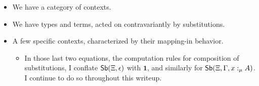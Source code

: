 \documentclass{article}
\begin{document}
\begin{itemize}
    \item We have a category of contexts.
    \item We have types and terms, acted on contravariantly by substitutions.
    \item A few specific contexts, characterized by their mapping-in behavior.
    \begin{itemize}
        \item In those last two equations, the computation rules for composition of substitutions,
        I conflate \(\mathsf{Sb}(\Xi,\epsilon)\) with \(\mathbf{1}\), and similarly for \(\mathsf{Sb}(\Xi,\Gamma, x :_\mu A)\).
        I continue to do so throughout this writeup.

\end{itemize}
\end{itemize}
\end{document}
